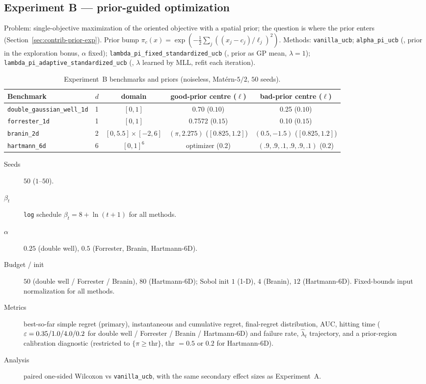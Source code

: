 \subsection{Experiment B --- prior-guided optimization}

Problem: single-objective maximization of the oriented objective with a spatial
prior; the question is where the prior enters (Section~\ref{sec:contrib-prior-exp}).
Prior bump $\pi_c(x)=\exp(-\tfrac12\sum_j((x_j-c_j)/\ell_j)^2)$. Methods:
\texttt{vanilla\_ucb}; \texttt{alpha\_pi\_ucb} (\RIGHT, prior in the exploration
bonus, $\alpha$ fixed); \texttt{lambda\_pi\_fixed\_standardized\_ucb} (\WRONG,
prior as GP mean, $\lambda=1$); \texttt{lambda\_pi\_adaptive\_standardized\_ucb}
(\WRONG, $\lambda$ learned by MLL, refit each iteration).

\begin{table}[htbp]\centering\small
\caption{Experiment~B benchmarks and priors (noiseless, Mat\'ern-$5/2$, $50$ seeds).}
\label{tab:expB}
\begin{tabular}{@{}lcccc@{}}
\toprule
Benchmark & $d$ & domain & good-prior centre ($\ell$) & bad-prior centre ($\ell$) \\
\midrule
\texttt{double\_gaussian\_well\_1d} & 1 & $[0,1]$ & 0.70 ($0.10$) & 0.25 ($0.10$) \\
\texttt{forrester\_1d} & 1 & $[0,1]$ & 0.7572 ($0.15$) & 0.10 ($0.15$) \\
\texttt{branin\_2d} & 2 & $[0,5.5]\times[-2,6]$ & $(\pi,2.275)$ ($[0.825,1.2]$) & $(0.5,-1.5)$ ($[0.825,1.2]$) \\
\texttt{hartmann\_6d} & 6 & $[0,1]^6$ & optimizer ($0.2$) & $(.9,.9,.1,.9,.9,.1)$ ($0.2$) \\
\bottomrule
\end{tabular}
\end{table}

\begin{description}
  \item[Seeds] $50$ ($1$--$50$).
  \item[$\beta_t$] \texttt{log} schedule $\beta_t=8+\ln(t+1)$ for all methods.
  \item[$\alpha$] $0.25$ (double well), $0.5$ (Forrester, Branin, Hartmann-6D).
  \item[Budget / init] $50$ (double well / Forrester / Branin), $80$
        (Hartmann-6D); Sobol init $1$ (1-D), $4$ (Branin), $12$ (Hartmann-6D).
        Fixed-bounds input normalization for all methods.
  \item[Metrics] best-so-far simple regret (primary), instantaneous and
        cumulative regret, final-regret distribution, AUC, hitting time
        ($\varepsilon=0.35/1.0/4.0/0.2$ for double well / Forrester / Branin /
        Hartmann-6D) and failure rate, $\widehat\lambda_t$ trajectory, and a
        prior-region calibration diagnostic (restricted to $\{\pi\ge\text{thr}\}$,
        thr $=0.5$ or $0.2$ for Hartmann-6D).
  \item[Analysis] paired one-sided Wilcoxon vs \texttt{vanilla\_ucb}, with the
        same secondary effect sizes as Experiment~A.
\end{description}


